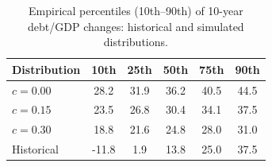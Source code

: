 \begin{table}
\caption{Empirical percentiles (10th–90th) of 10-year debt/GDP changes: historical and simulated distributions.}
\label{tab:debt_change_percentiles}
\begin{tabular}{lccccc}
\toprule
Distribution & 10th & 25th & 50th & 75th & 90th \\
\midrule
$c=0.00$ & 28.2 & 31.9 & 36.2 & 40.5 & 44.5 \\
$c=0.15$ & 23.5 & 26.8 & 30.4 & 34.1 & 37.5 \\
$c=0.30$ & 18.8 & 21.6 & 24.8 & 28.0 & 31.0 \\
Historical & -11.8 & 1.9 & 13.8 & 25.0 & 37.5 \\
\bottomrule
\end{tabular}
\end{table}
